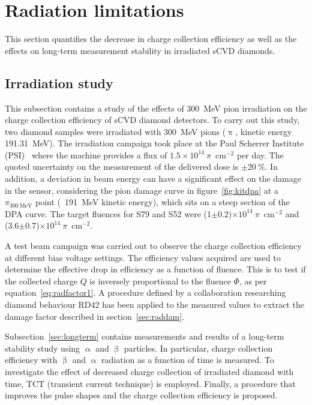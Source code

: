 \clearpage
\section{Radiation limitations}
\label{sec:radlimit}
This section quantifies the decrease in charge collection efficiency as well as the effects on long-term measurement stability in irradiated sCVD diamonds.


\subsection{Irradiation study}
This subsection contains a study of the effects of 300~MeV pion irradiation on the charge collection efficiency of sCVD diamond detectors. To carry out this study, two diamond samples were irradiated with 300~MeV pions ($\uppi$, kinetic energy 191.31~MeV). The irradiation campaign took place at the Paul Scherrer Institute (PSI)~\cite{PSI:00000} where the machine provides a flux of $1.5\times10^{14}~\pi$~cm$^{-2}$ per day. The quoted uncertainty on the measurement of the delivered dose is $\pm20~\%$. In addition, a deviation in beam energy can have a significant effect on the damage in the sensor, considering the pion damage curve in figure~\ref{fig:kitdpa} at a $\pi_{\mathrm{300~MeV}}$ point (~191~MeV kinetic energy), which sits on a steep section of the DPA curve. The target fluences for S79 and S52 were  (1$\pm0.2$)$\times10^{14}~\pi$~cm$^{-2}$ and (3.6$\pm0.7$)$\times10^{14}~\pi$~cm$^{-2}$.

A test beam campaign was carried out to observe the charge collection efficiency at different bias voltage settings. The efficiency values acquired are used to determine the effective drop in efficiency as a function of fluence. This is to test if the collected charge $Q$ is inversely proportional to the fluence $\Phi$, as per equation~\ref{eq:radfactor1}. A procedure defined by a collaboration researching diamond behaviour RD42 has been applied to the measured values to extract the damage factor described in section~\ref{sec:raddam}.

Subsection~\ref{sec:longterm} contains measurements and results of a long-term stability study using $\upalpha$ and $\upbeta$ particles. In particular, charge collection efficiency with $\upbeta$ and $\upalpha$ radiation as a function of time is measured. To investigate the effect of decreased charge collection of irradiated diamond with time, TCT (transient current technique) is employed. Finally, a procedure that improves the pulse shapes and the charge collection efficiency is proposed.



